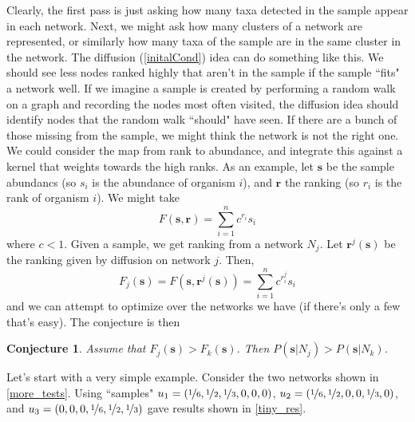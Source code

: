 \documentclass[10pt]{article}
\newtheorem{conj}{Conjecture}
\theoremstyle{definition}
\numberwithin{theorem}{section}
\numberwithin{definition}{section}
\numberwithin{lemma}{section}
\numberwithin{corollary}{section}
\numberwithin{clm}{section}
\numberwithin{rmk}{section}
\newcommand{\nhalf}{\nicefrac{1}{2}}
\renewcommand{\b}{\bm}
\begin{document}
Clearly, the first pass is just asking how many taxa detected in the sample appear in each network. Next, we might ask how many clusters of a network are represented, or similarly how many taxa of the sample are in the same cluster in the network. The diffusion (\cref{initalCond}) idea can do something like this. We should see less nodes ranked highly that aren't in the sample if the sample ``fits" a network well. If we imagine a sample is created by performing a random walk on a graph and recording the nodes most often visited, the diffusion idea should identify nodes that the random walk ``should" have seen. If there are a bunch of those missing from the sample, we might think the network is not the right one. We could consider the map from rank to abundance, and integrate this against a kernel that weights towards the high ranks. As an example, let $\b{s}$ be the sample abundancs (so $s_i$ is the abundance of organism $i$), and $\b{r}$ the ranking (so $r_i$ is the rank of organism $i$). We might take 
\[
F(\b{s},\b{r}) = \sum_{i=1}^n c^{r_i} s_i
\]
where $c<1$. Given a sample, we get ranking from a network $N_j$. Let $\b{r}^j(\b{s})$ be the ranking given by diffusion on network $j$. Then,
\[
F_j(\b{s}) = F(\b{s},\b{r}^j(\b{s})) = \sum_{i=1}^n c^{r_i^j} s_i
\]
and we can attempt to optimize over the networks we have (if there's only a few that's easy). The conjecture is then
\begin{conj}
	Assume that $F_j(\b{s}) > F_k(\b{s})$. Then $P(\b{s}|N_j) > P(\b{s}|N_k)$.
\end{conj}



Let's start with a very simple example. Consider the two networks shown in \cref{more_tests}. Using ``samples" $u_1 = (\nicefrac{1}{6},\nhalf,\nicefrac{1}{3},0,0,0)$, $u_2 = (\nicefrac{1}{6},\nhalf,0,0,\nicefrac{1}{3},0)$, and $u_3= (0,0,0,\nicefrac{1}{6},\nhalf,\nicefrac{1}{3})$ gave results shown in \cref{tiny_res}.
\end{document}
